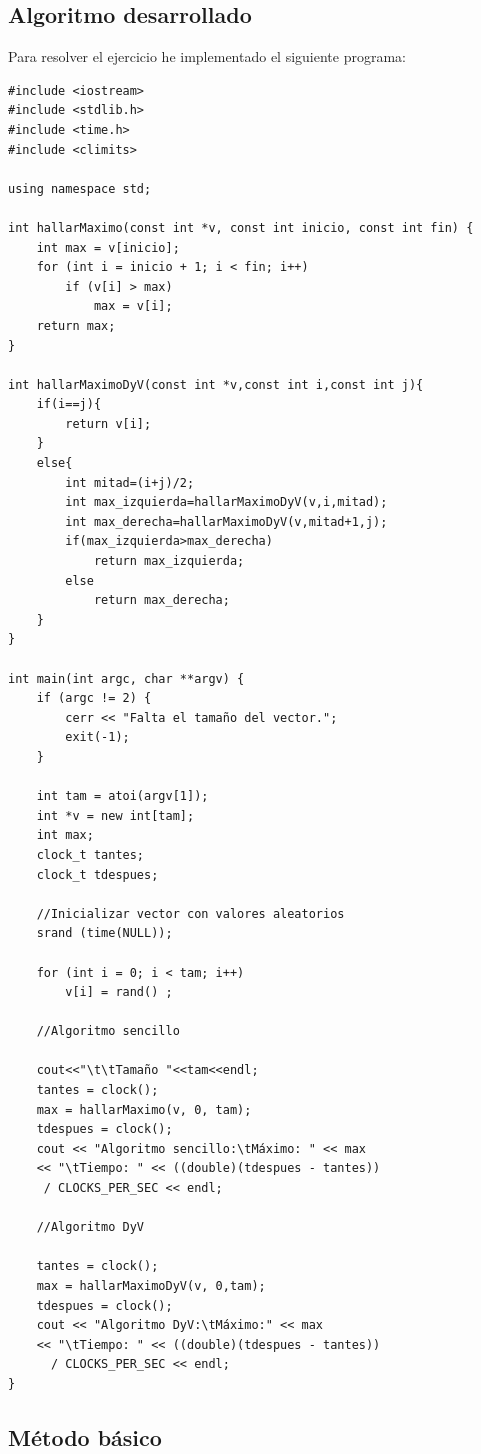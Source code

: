 \documentclass[12pt,spanish]{article}
\begin{document}
\subsection{Algoritmo desarrollado}
Para resolver el ejercicio he implementado el siguiente programa:
\begin{verbatim}
#include <iostream>
#include <stdlib.h>  
#include <time.h>      
#include <climits>

using namespace std;

int hallarMaximo(const int *v, const int inicio, const int fin) {
	int max = v[inicio];
	for (int i = inicio + 1; i < fin; i++)
		if (v[i] > max)
			max = v[i];
	return max;
}

int hallarMaximoDyV(const int *v,const int i,const int j){
	if(i==j){
		return v[i];
	}
	else{
		int mitad=(i+j)/2;
		int max_izquierda=hallarMaximoDyV(v,i,mitad);
		int max_derecha=hallarMaximoDyV(v,mitad+1,j);
		if(max_izquierda>max_derecha)
			return max_izquierda;
		else
			return max_derecha;
	}
}

int main(int argc, char **argv) {
	if (argc != 2) {
		cerr << "Falta el tamaño del vector.";
		exit(-1);
	}

	int tam = atoi(argv[1]);
	int *v = new int[tam];
	int max;
	clock_t tantes;   
	clock_t tdespues; 

	//Inicializar vector con valores aleatorios
	srand (time(NULL));

	for (int i = 0; i < tam; i++)
		v[i] = rand() ;

	//Algoritmo sencillo
	
	cout<<"\t\tTamaño "<<tam<<endl;
	tantes = clock();
	max = hallarMaximo(v, 0, tam);
	tdespues = clock();
	cout << "Algoritmo sencillo:\tMáximo: " << max 
	<< "\tTiempo: " << ((double)(tdespues - tantes))
	 / CLOCKS_PER_SEC << endl;
	 
	//Algoritmo DyV

	tantes = clock();
	max = hallarMaximoDyV(v, 0,tam);
	tdespues = clock();
	cout << "Algoritmo DyV:\tMáximo:" << max 
	<< "\tTiempo: " << ((double)(tdespues - tantes)) 
	  / CLOCKS_PER_SEC << endl;
}
\end{verbatim}
\newpage
\subsection{Método básico}
\end{document}
